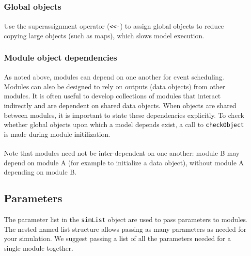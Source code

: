 \documentclass{article}
\begin{document}
\subsubsection{Global objects}

\paragraph{}
Use the superassignment operator (\texttt{<}\texttt{<-}) to assign global objects to reduce copying large objects (such as maps), which slows model execution.

\subsubsection{Module object dependencies}

\paragraph{}
As noted above, modules can depend on one another for event scheduling. Modules can also be designed to rely on outputs (data objects) from other modules. It is often useful to develop collections of modules that interact indirectly and are dependent on shared data objects. When objects are shared between modules, it is important to state these dependencies explicitly. To check whether global objects upon which a model depends exist, a call to \texttt{checkObject} is made during module initilization.

\paragraph{}
Note that modules need not be inter-dependent on one another: module B may depend on module A (for example to initialize a data object), without module A depending on module B.

\subsection{Parameters}

\paragraph{}
The parameter list in the \texttt{simList} object are used to pass parameters to modules. The nested named list structure allows passing as many parameters as needed for your simulation. We suggest passing a list of all the parameters needed for a single module together.
\end{document}

